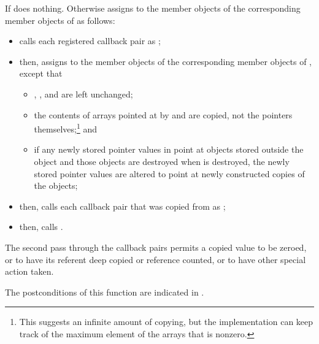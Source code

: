 \begin{itemdescr}
\pnum
\effects
If
does nothing.
Otherwise assigns to the member objects of
the corresponding member objects of  as follows:

\begin{itemize}
\item calls each registered callback pair  as
;

\item then, assigns to the member objects of  the corresponding member objects of
, except that

\begin{itemize}
\item {}, , and  are left unchanged;

\item the contents of arrays pointed at by  and  are copied,
not the pointers themselves;\footnote{ This suggests an infinite amount of copying, but the implementation can keep
track of the maximum element of the arrays that is nonzero.}
and

\item if any newly stored pointer values in  point at objects stored outside
the object  and those objects are destroyed when  is destroyed, the
newly stored pointer values are altered to point at newly constructed copies of the
objects;
\end{itemize}

\item then, calls each callback pair that was copied from  as
;

\item then, calls .

\end{itemize}

\pnum
\begin{note}
The second pass through the callback pairs permits a copied 
value to be zeroed, or to have its referent deep copied or reference counted, or to have
other special action taken.
\end{note}

\pnum
\ensures
The postconditions of this function are indicated in .



\end{itemdescr}
